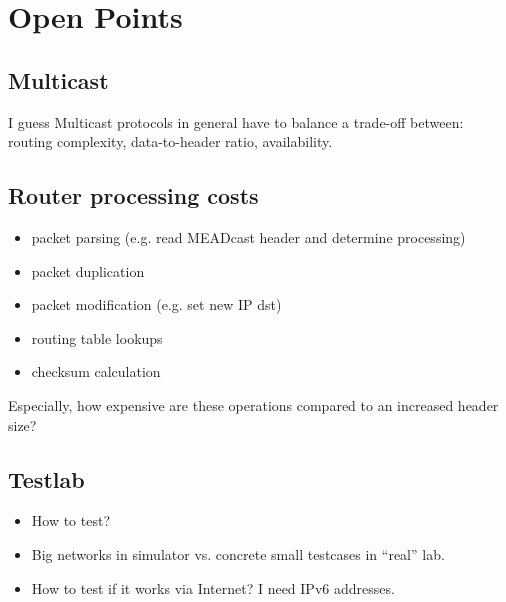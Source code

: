 \chapter{Open Points} %
\label{chap:Open Points}

\section{Multicast} %
\label{sec:Multicast}
I guess Multicast protocols in general have to balance a trade-off between:
routing complexity, data-to-header ratio, availability.


\section{Router processing costs} %
\label{sec:Router processing costs}
\begin{itemize}\itemsep0em
    \item packet parsing (e.g. read MEADcast header and determine processing)
    \item packet duplication
    \item packet modification (e.g. set new IP dst)
    \item routing table lookups
    \item checksum calculation
\end{itemize}

Especially, how expensive are these operations compared to an increased header
size?

\section{Testlab} %
\label{sec:Testlab}
\begin{itemize}\itemsep0em
    \item How to test?
    \item Big networks in simulator vs. concrete small testcases in ``real''
        lab.
    \item How to test if it works via Internet? I need IPv6 addresses.
\end{itemize}
